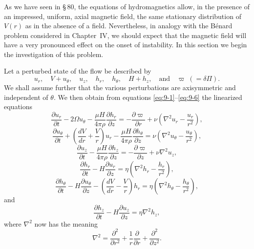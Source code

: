 As we have seen in \S\,80, the equations of hydromagnetics allow, in the presence of an impressed, uniform, axial magnetic field, the same stationary distribution of $V(r)$ as in the absence of a field. Nevertheless, in analogy with the B\'enard problem considered in Chapter~IV, we should expect that the magnetic field will have a very pronounced effect on the onset of instability. In this section we begin the investigation of this problem.

Let a perturbed state of the flow be described by
\begin{equation}
u_r, \quad V\!+\!u_\theta, \quad u_z, \quad h_r, \quad h_\theta, \quad H\!+\!h_z, \quad \text{and} \quad \varpi\; (= \delta\Pi). \label{eq:9-148}
\end{equation}
We shall assume further that the various perturbations are axisymmetric and independent of $\theta$. We then obtain from equations \eqref{eq:9-1}--\eqref{eq:9-6} the linearized equations
\begin{equation}
\frac{\partial u_r}{\partial t} - 2\Omega u_\theta - \frac{\mu H}{4\pi\rho}\frac{\partial h_r}{\partial z} = -\frac{\partial \varpi}{\partial r} + \nu\left(\nabla^2 u_r - \frac{u_r}{r^2}\right), \label{eq:9-149}
\end{equation}
\begin{equation}
\frac{\partial u_\theta}{\partial t} + \left(\frac{dV}{dr} + \frac{V}{r}\right) u_r - \frac{\mu H}{4\pi\rho}\frac{\partial h_\theta}{\partial z} = \nu\left(\nabla^2 u_\theta - \frac{u_\theta}{r^2}\right), \label{eq:9-150}
\end{equation}
\begin{equation}
\frac{\partial u_z}{\partial t} - \frac{\mu H}{4\pi\rho}\frac{\partial h_z}{\partial z} = -\frac{\partial \varpi}{\partial z} + \nu \nabla^2 u_z, \label{eq:9-151}
\end{equation}
\begin{equation}
\frac{\partial h_r}{\partial t} - H \frac{\partial u_r}{\partial z} = \eta\left(\nabla^2 h_r - \frac{h_r}{r^2}\right), \label{eq:9-152}
\end{equation}
\begin{equation}
\frac{\partial h_\theta}{\partial t} - H \frac{\partial u_\theta}{\partial z} - \left(\frac{dV}{dr} - \frac{V}{r}\right) h_r = \eta\left(\nabla^2 h_\theta - \frac{h_\theta}{r^2}\right), \label{eq:9-153}
\end{equation}
and
\begin{equation}
\frac{\partial h_z}{\partial t} - H \frac{\partial u_z}{\partial z} = \eta \nabla^2 h_z, \label{eq:9-154}
\end{equation}
where $\nabla^2$ now has the meaning
\begin{equation}
\nabla^2 = \frac{\partial^2}{\partial r^2} + \frac{1}{r}\frac{\partial}{\partial r} + \frac{\partial^2}{\partial z^2}. \label{eq:9-155}
\end{equation}

